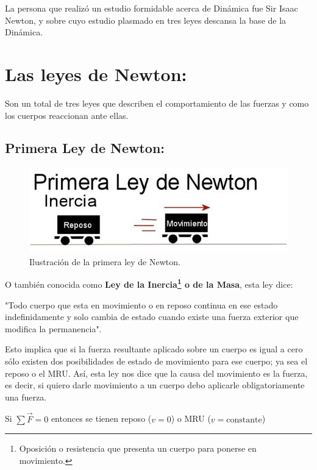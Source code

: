 \documentclass[a5paper,pagesize,10pt,bibtotoc,pointlessnumbers,
normalheadings,DIV=9,fleqn,x11names,table,twoside=false]{scrbook}
\begin{document}
La persona que realizó un estudio formidable acerca de Dinámica fue Sir Isaac Newton, y sobre cuyo estudio plasmado en tres leyes 
descansa la base de la Dinámica.
 
\section{Las leyes de Newton:}

Son un total de tres leyes que describen el comportamiento de las fuerzas y como los cuerpos reaccionan ante ellas.

\subsection{Primera Ley de Newton:}

\begin{figure}[ht]
 \centering
 \includegraphics[scale=0.5]{images/primera-ley-de-newton.jpg}
 \caption{Ilustración de la primera ley de Newton.}\label{ac}
\end{figure} 

O también conocida como \textbf{Ley de la Inercia\footnote{Oposición o resistencia que presenta un cuerpo para ponerse 
en movimiento.} o de la Masa}, esta ley dice:

\begin{tcolorbox}
"Todo cuerpo que esta en movimiento o en reposo continua en ese estado indefinidamente y solo cambia de estado cuando existe una 
fuerza exterior que modifica la permanencia".
\end{tcolorbox}

Esto implica que si la fuerza resultante aplicado sobre un cuerpo es igual a cero sólo existen dos posibilidades de estado de 
movimiento para ese cuerpo; ya sea el reposo o el MRU. Así, esta ley nos dice que la causa del movimiento es la fuerza, es decir, 
si quiero darle movimiento a un cuerpo debo aplicarle obligatoriamente una fuerza.

\begin{tcolorbox}
Si $\sum \vec{F} = 0$ entonces se tienen reposo ($v = 0$) o MRU ($v =  \text{constante}$)
\end{tcolorbox}
\end{document}
